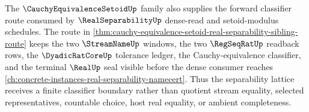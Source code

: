 The $\CauchyEquivalenceSetoidUp$ family also supplies the forward classifier route consumed by $\RealSeparabilityUp$ dense-read and setoid-modulus schedules. The route in \autoref{thm:cauchy-equivalence-setoid-real-separability-sibling-route} keeps the two $\StreamNameUp$ windows, the two $\RegSeqRatUp$ readback rows, the $\DyadicRatCoreUp$ tolerance ledger, the Cauchy-equivalence classifier, and the terminal $\RealUp$ seal visible before the dense consumer reaches \autoref{ch:concrete-instances-real-separability-namecert}. Thus the separability lattice receives a finite classifier boundary rather than quotient stream equality, selected representatives, countable choice, host real equality, or ambient completeness.
